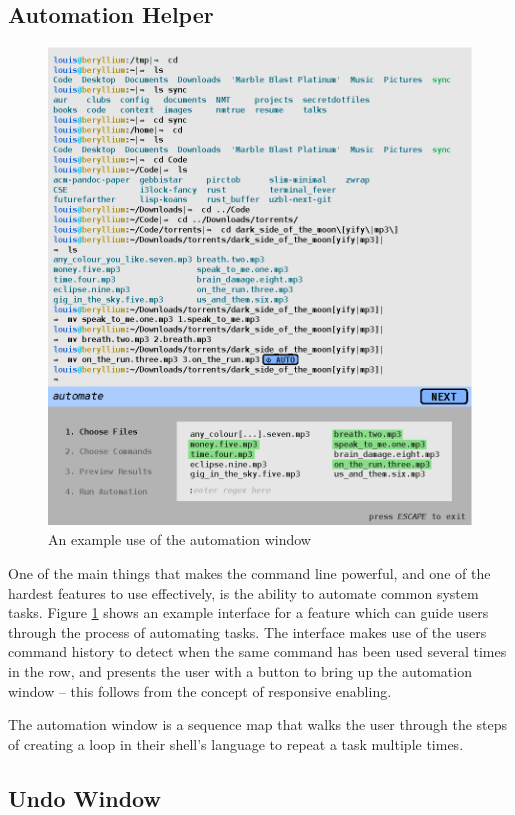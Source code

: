\subsection{Automation Helper}

\begin{figure}[H]
  \centering
  \includegraphics[width=0.8\linewidth]{figures/interface/automation.eps}
  \caption{An example use of the automation window}
  \label{fig:autow}
\end{figure}

One of the main things that makes the command line powerful, and one of the
hardest features to use effectively, is the ability to automate common system
tasks. Figure \ref{fig:autow} shows an example interface for a feature which can
guide users through the process of automating tasks. The interface makes use of
the users command history to detect when the same command has been used several
times in the row, and presents the user with a button to bring up the automation
window \--- this follows from the concept of responsive enabling.

The automation window is a sequence map that walks the user through the steps of
creating a loop in their shell's language to repeat a task multiple times.

\subsection{Undo Window}

